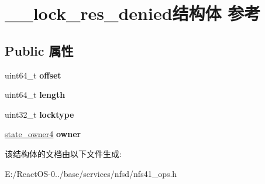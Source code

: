 \hypertarget{struct____lock__res__denied}{}\section{\+\_\+\+\_\+lock\+\_\+res\+\_\+denied结构体 参考}
\label{struct____lock__res__denied}
\subsection*{Public 属性}
\begin{DoxyCompactItemize}
\item 
\mbox{\label{struct____lock__res__denied_a35515695e3b41860180b0ed3132d6710}} 
uint64\+\_\+t {\bfseries offset}
\item 
\mbox{\label{struct____lock__res__denied_a9edd32ff5a74ef956ea6ad398502c4e0}} 
uint64\+\_\+t {\bfseries length}
\item 
\mbox{\label{struct____lock__res__denied_a16b2683d4eddc156c81c106813f81854}} 
uint32\+\_\+t {\bfseries locktype}
\item 
\mbox{\label{struct____lock__res__denied_a669e724f00d9698e809c36351ea41d52}} 
\hyperlink{struct____state__owner4}{state\+\_\+owner4} {\bfseries owner}
\end{DoxyCompactItemize}


该结构体的文档由以下文件生成\+:\begin{DoxyCompactItemize}
\item 
E\+:/\+React\+O\+S-\/0../base/services/nfsd/nfs41\+\_\+ops.\+h\end{DoxyCompactItemize}

